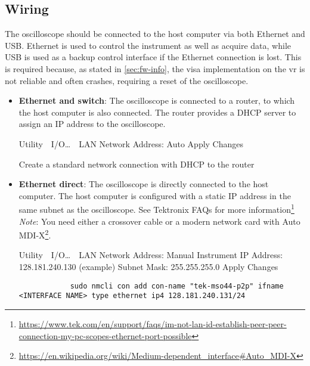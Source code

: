 \documentclass[a4paper,english,twoside,10pt]{article}
\newenvironment{scope_setting}{
	\parskip=5pt\par\nopagebreak\centering\sffamily%
	\begin{tabular}{>{\columncolor{cyan!15}}m{2em} >{\columncolor{cyan!15}}m{.8\textwidth}}
	 & 
} {
	\\
	\end{tabular}
	\par\noindent\ignorespacesafterend%
}
\newenvironment{laptop_setting}{
	\parskip=5pt\par\nopagebreak\centering\sffamily%
	\begin{tabular}{>{\columncolor{red!15}}m{2em} >{\columncolor{red!15}}m{.8\textwidth}}
	 & 
} {
	\\
	\end{tabular}
	\par\noindent\ignorespacesafterend%
}
\begin{document}
\subsection{Wiring}
The oscilloscope should be connected to the host computer via both Ethernet and USB. Ethernet is used to control the instrument as well as acquire data, while USB is used as a backup control interface if the Ethernet connection is lost. This is required because, as stated in \autoref{sec:fw-info}, the visa implementation on the \gls{vr} is not reliable and often crashes, requiring a reset of the oscilloscope.
\begin{itemize}
	\item \textbf{Ethernet and switch}: The oscilloscope is connected to a router, to which the host computer is also connected. The router provides a DHCP server to assign an IP address to the oscilloscope.
	\begin{scope_setting}
		Utility\ \rightarrow\  I/O\ldots\ \rightarrow\  LAN\newline
		Network Address: Auto\newline
		Apply Changes
	\end{scope_setting}
	\begin{laptop_setting}
		Create a standard network connection with DHCP to the router
	\end{laptop_setting}

	\item \textbf{Ethernet direct}: The oscilloscope is directly connected to the host computer. The host computer is configured with a static IP address in the same subnet as the oscilloscope. See Tektronix FAQs for more information\footnote{\url{https://www.tek.com/en/support/faqs/im-not-lan-id-establish-peer-peer-connection-my-pc-scopes-ethernet-port-possible}}\\
	\textit{Note}: You need either a crossover cable or a modern network card with Auto MDI-X\footnote{\url{https://en.wikipedia.org/wiki/Medium-dependent_interface\#Auto_MDI-X}}.
	\begin{scope_setting}
		Utility\ \rightarrow\  I/O\ldots\ \rightarrow\  LAN\newline
		Network Address: Manual\newline
		Instrument IP Address: 128.181.240.130 (example)\newline
		Subnet Mask: 255.255.255.0\newline
		Apply Changes
	\end{scope_setting}
	\begin{laptop_setting}
		\begin{verbatim}
			sudo nmcli con add con-name "tek-mso44-p2p" ifname <INTERFACE NAME> type ethernet ip4 128.181.240.131/24
		\end{verbatim}
	\end{laptop_setting}


\end{itemize}
\end{document}

